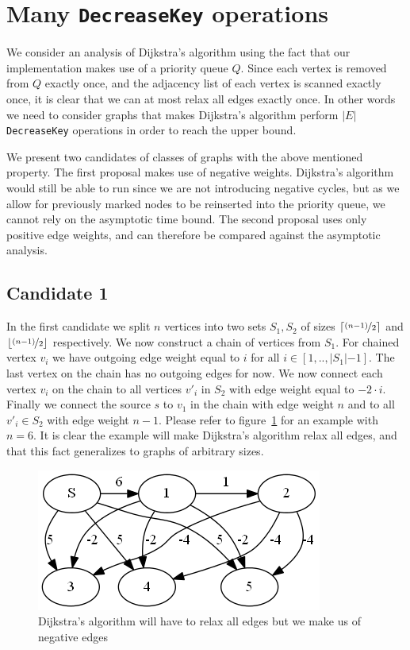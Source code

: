 \documentclass[a4paper,oneside,article,11pt]{memoir}
\begin{document}
\section{Many \texttt{DecreaseKey} operations}
\label{sec:many_decreasekey}
We consider an analysis of Dijkstra's algorithm using the fact that our implementation makes use of a priority queue $Q$. Since each vertex is removed from $Q$ exactly once, and the adjacency list of each vertex is scanned exactly once, it is clear that we can at most relax all edges exactly once.
In other words we need to consider graphs that makes Dijkstra's algorithm perform $\vert E \vert$ \texttt{DecreaseKey} operations in order to reach the upper bound.

We present two candidates of classes of graphs with the above mentioned property. The first proposal makes use of negative weights. Dijkstra's algorithm would still be able to run since we are not introducing negative cycles, but as we allow for previously marked nodes to be reinserted into the priority queue, we cannot rely on the asymptotic time bound. The second proposal uses only positive edge weights, and can therefore be compared against the asymptotic analysis.

\subsection{Candidate 1}
In the first candidate we split $n$ vertices into two sets $S_1, S_2$ of sizes $\lceil \nicefrac{(n-1)}{2} \rceil$ and $\lfloor \nicefrac{(n-1)}{2} \rfloor$ respectively. We now construct a chain of vertices from $S_1$. For chained vertex $v_i$ we have outgoing edge weight equal to $i$ for all $i \in [1, .. ,\lvert S_1 \lvert - 1]$. The last vertex on the chain has no outgoing edges for now. We now connect each vertex $v_i$ on the chain to all vertices ${v'}_i$ in $S_2$ with edge weight equal to $-2 \cdot i$. Finally we connect the source $s$ to $v_1$ in the chain with edge weight $n$ and to all ${v'}_i \in S_2$ with edge weight $n-1$. Please refer to figure~\ref{figure:graph_neg_weights} for an example with $n=6$. It is clear the example will make Dijkstra's algorithm relax all edges, and that this fact generalizes to graphs of arbitrary sizes.

\begin{figure}[H]
\centering
\includegraphics[scale=0.8]{../figures/graph_neg_weights.png}
\caption{Dijkstra's algorithm will have to relax all edges but we make us of negative edges}
\label{figure:graph_neg_weights}
\end{figure}
\end{document}
